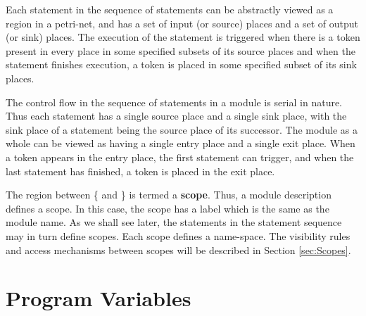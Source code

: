 \documentclass{article}
\begin{document}
Each statement in the sequence
of statements can be abstractly 
viewed as a region
in a petri-net,  and has a 
set of input (or source) places  and a set of output
(or sink)  places.  
The execution of the statement is triggered when
there is a token present in every place in some specified subsets
of its source 
places and when the statement finishes execution,
a token is placed in some specified subset of its sink places.   

The control flow in the sequence of statements
in a module is serial in nature.  Thus each
statement has a single source place and a single
sink place, with the sink place of a statement being 
the source place of its successor.
The module as a whole can be viewed as having
a single entry place and a single exit place.
When a token appears in the entry place, the first
statement can trigger, and when the last statement
has finished, a token is placed in the exit
place.  

The region between \{ and \} is termed a {\bf scope}.  Thus, 
a module description defines a scope.  In this case, 
the scope has a label which is the same as the module name.
As we shall see later, the statements in the statement sequence
may in turn define scopes.  Each scope defines a name-space.  
The visibility
rules and access mechanisms between scopes will be described
in Section \ref{sec:Scopes}.

\section{Program Variables} \label{sec:Objects}
\end{document}
